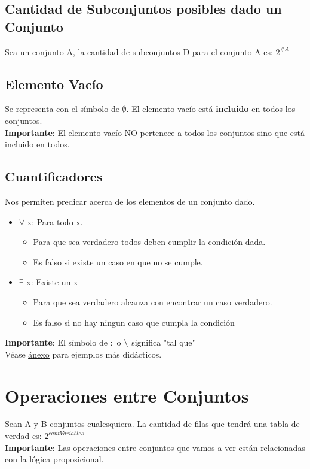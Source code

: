 \documentclass[10pt,a4paper]{article}
\begin{document}
\subsection*{Cantidad de Subconjuntos posibles dado un Conjunto}
Sea un conjunto A, la cantidad de subconjuntos D para el conjunto A es: $2^{\#A}$
\subsection*{Elemento Vacío}
Se representa con el símbolo de $\emptyset$. El elemento vacío está \textbf{incluido} en todos los conjuntos. \\
\textbf{Importante}: El elemento vacío NO pertenece a todos los conjuntos sino que está incluido en todos.
\subsection*{Cuantificadores}
Nos permiten predicar acerca de los elementos de un conjunto dado. 
\begin{itemize}
    \item $\forall$ x: Para todo x.
    \begin{itemize}
        \item Para que sea verdadero todos deben cumplir la condición dada.
        \item Es falso si existe un caso en que no se cumple.
    \end{itemize}
    \item $\exists$ x: Existe un x
    \begin{itemize}
        \item Para que sea verdadero alcanza con encontrar un caso verdadero.
        \item Es falso si no hay ningun caso que cumpla la condición
    \end{itemize}
\end{itemize}
\textbf{Importante}: El símbolo de $:$ o $\symbol{92}$ significa "tal que" \\
Véase \hyperref[subsec:cuantificadores]{\underline{ánexo}} para ejemplos más didácticos.
\section*{Operaciones entre Conjuntos}
Sean A y B conjuntos cualesquiera. La cantidad de filas que tendrá una tabla de verdad es: \textbf{$2^{cantVariables}$} \\
\textbf{Importante}: Las operaciones entre conjuntos que vamos a ver están relacionadas con la lógica proposicional.
\newpage
\end{document}
